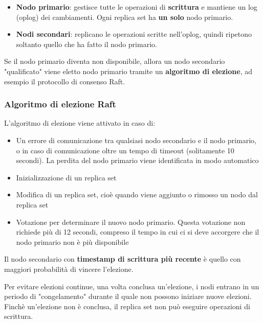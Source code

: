 \documentclass[a4paper]{article}
\begin{document}
\begin{itemize}
  \item \textbf{Nodo primario}: gestisce tutte le operazioni di \textbf{scrittura}
    e mantiene un log (oplog) dei cambiamenti. Ogni replica set ha \textbf{un solo} nodo
    primario.

  \item \textbf{Nodi secondari}: replicano le operazioni scritte nell'oplog, quindi
    ripetono soltanto quello che ha fatto il nodo primario.
\end{itemize}
Se il nodo primario diventa non disponibile, allora un nodo secondario "qualificato"
viene eletto nodo primario tramite un \textbf{algoritmo di elezione}, ad esempio
il protocollo di consenso Raft.

\subsubsection{Algoritmo di elezione Raft}
L'algoritmo di elezione viene attivato in caso di:
\begin{itemize}
  \item Un errore di comunicazione tra
    qualsiasi nodo secondario e il nodo primario, o in caso di comunicazione oltre
    un tempo di timeout (solitamente 10 secondi). La perdita del nodo primario viene
    identificata in modo automatico

  \item Inizializzazione di un replica set

  \item Modifica di un replica set, cioè quando viene aggiunto o rimosso un nodo
    dal replica set

  \item Votazione per determinare il nuovo nodo primario. Questa votazione non
    richiede più di 12 secondi, compreso il tempo in cui ci si deve accorgere
    che il nodo primario non è più disponibile
\end{itemize}

\vspace{1em}
\noindent
Il nodo secondario con \textbf{timestamp di scrittura più recente} è quello
con maggiori probabilità di vincere l'elezione.

Per evitare elezioni continue, una volta conclusa un'elezione, i nodi entrano
in un periodo di "congelamento" durante il quale non possono iniziare nuove elezioni.
Finchè un'elezione non è conclusa, il replica set non può eseguire operazioni di
scrittura.
\end{document}
